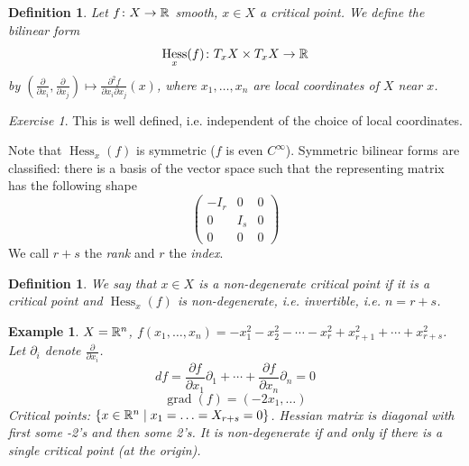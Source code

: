 \documentclass[A4paper, british]{amsart}
\theoremstyle{darkgreentheorem}
\theoremstyle{darkbluedefinition}
\newtheorem{defn}[thm]{Definition}
\theoremstyle{darkredexample}
\newtheorem{exa}[thm]{Example}
\theoremstyle{remark}
\newtheorem{exe}[thm]{Exercise}
\DeclareMathOperator{\Hess}{Hess}
\newcommand{\1}{\mathbbm{1}}
\newcommand{\tms}{\times}
\begin{document}
\begin{defn}
    Let $f\colon X\to \mathbb{R}$ smooth, $x\in X$ a critical point.
    We define the bilinear form
    \[ \Hess_{x}(f)\colon T_{x}X\tms T_{x}X\to \R \]
    by $\left(\frac{\partial}{\partial x_{i}},\frac{\partial}{\partial x_{j}}\right)\mapsto \frac{\partial^{2} f}{\partial x_{i}\partial x_{j}}(x) $, where $x_{1},\ldots,x_{n}$ are local coordinates of $X$ near $x$.
\end{defn}

\begin{exe}
    This is well defined, i.e. independent of the choice of local coordinates.
\end{exe}

Note that $\Hess_{x}(f)$ is symmetric ($f$ is even $C^{\infty}$).
Symmetric bilinear forms are classified: there is a basis of the vector space such that the representing matrix has the following shape
\[ \begin{pmatrix} -I_{r} & 0 & 0 \\ 0 & I_{s} & 0 \\ 0 & 0 & 0\end{pmatrix} \]
We call $r+s$ the \textit{rank} and $r$ the \textit{index}.

\begin{defn}
    We say that $x\in X$ is a \textit{non-degenerate} critical point if it is a critical point and $\Hess_{x}(f)$ is non-degenerate, i.e. invertible, i.e. $n=r+s$.
\end{defn}

\begin{exa}
    $X=\mathbb{R}^{n}$, $f(x_{1},\ldots,x_{n})=-x_{1}^{2}-x_{2}^{2}-\cdots -x_{r}^{2} + x_{r+1}^{2}+\cdots +x_{r+s}^{2}$.
    Let $\partial_{i}$ denote $\frac{\partial}{\partial x_{i}}$.
    \[ df=\frac{\partial f}{\partial x_{1}}\partial_{1}+\cdots +\frac{\partial f}{\partial x_{n}}\partial_{n}=0 \]
    \[ \operatorname{grad}(f)=(-2x_{1},\ldots) \]
    Critical points: $\{ x\in \mathbb{R}^{n}\mid x_{1}=\ldots=X_{r+s}=0\}$.
    Hessian matrix is diagonal with first some -2's and then some 2's.
    It is non-degenerate if and only if there is a single critical point (at the origin).
\end{exa}
\end{document}
